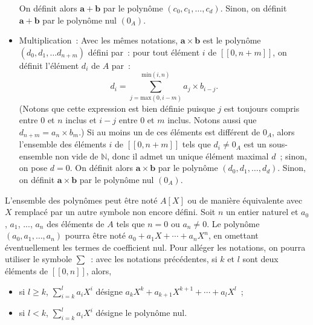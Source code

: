 \begin{itemize}[nosep]
            On définit alors $\mathbf{a} + \mathbf{b}$ par le polynôme $(c_0, c_1, \dots, c_d)$.
            Sinon, on définit $\mathbf{a} + \mathbf{b}$ par le polynôme nul $(0_A)$.
        \item Multiplication : Avec les mêmes notations, $\mathbf{a} \times \mathbf{b}$ est le polynôme $(d_0, d_1, \dots d_{n+m})$ défini par : pour tout élément $i$ de $[\![0, n+m]\!]$, on définit l'élément $d_i$ de $A$ par :
            \begin{equation*}
                d_i = \sum_{j=\mathrm{max}(0,i-m)}^{\mathrm{min}(i,n)} a_j \times b_{i-j}.
            \end{equation*}
            (Notons que cette expression est bien définie puisque $j$ est toujours compris entre $0$ et $n$ inclus et $i-j$ entre $0$ et $m$ inclus.
            Notons aussi que $d_{n+m} = a_n \times b_m$.)
            Si au moins un de ces éléments est différent de $0_A$, alors l'ensemble des éléments $i$ de $[\![0, n+m]\!]$ tels que $d_i \neq 0_A$ est un sous-ensemble non vide de $\mathbb{N}$, donc il admet un unique élément maximal $d$ ; sinon, on pose $d = 0$.
            On définit alors $\mathbf{a} \times \mathbf{b}$ par le polynôme $(d_0, d_1, \dots, d_d)$.
            Sinon, on définit $\mathbf{a} \times \mathbf{b}$ par le polynôme nul $(0_A)$.
    \end{itemize}
    L'ensemble des polynômes peut être noté $A[X]$ ou de manière équivalente avec $X$ remplacé par un autre symbole non encore défini. 
    Soit $n$ un entier naturel et $a_0$, $a_1$, ..., $a_n$ des éléments de $A$ tels que $n = 0$ ou $a_n \neq 0$.
    Le polynôme $(a_0, a_1, \dots, a_n)$ pourra être noté $a_0 + a_1 X + \cdots + a_n X^n$, en omettant éventuellement les termes de coefficient nul.
    Pour alléger les notations, on pourra utiliser le symbole $\sum$ : avec les notations précédentes, si $k$ et $l$ sont deux éléments de $[\![0, n]\!]$, alors, 
    \begin{itemize}[nosep]
        \item si $l \geq k$, $\sum_{i=k}^l a_i X^i$ désigne $a_k X^k + a_{k+1} X^{k+1} + \cdots + a_l X^l$ ;
        \item si $l < k$, $\sum_{i=k}^l a_i X^i$ désigne le polynôme nul.
    \end{itemize}

\medskip

